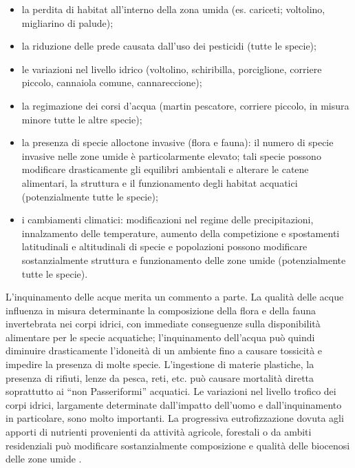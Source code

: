 \documentclass[10pt,twoside,openany,x11names,svgnames,italian,a5paper,dvipsnames,table]{memoir}
\begin{document}
\begin{itemize}
  \item la perdita di habitat all'interno della zona umida (es. cariceti; voltolino, migliarino di palude);
  \item la riduzione delle prede causata dall’uso dei pesticidi (tutte le specie);
  \item le variazioni nel livello idrico (voltolino, schiribilla, porciglione, corriere piccolo, cannaiola comune, cannareccione);
  \item la regimazione dei corsi d'acqua (martin pescatore, corriere piccolo, in misura minore tutte le altre specie);
  \item la presenza di specie alloctone invasive (flora e fauna): il numero di specie invasive nelle zone umide è particolarmente elevato; tali specie possono modificare drasticamente gli equilibri ambientali e alterare le catene alimentari, la struttura e il funzionamento degli habitat acquatici (potenzialmente tutte le specie);
  \item i cambiamenti climatici: modificazioni nel regime delle precipitazioni, innalzamento delle temperature, aumento della competizione e spostamenti latitudinali e altitudinali di specie e popolazioni possono modificare sostanzialmente struttura e funzionamento delle zone umide (potenzialmente tutte le specie).
\end{itemize}



L'inquinamento delle acque merita un commento a parte. La qualità delle acque influenza in misura determinante la composizione della flora e della fauna invertebrata nei corpi idrici, con immediate conseguenze sulla disponibilità alimentare per le specie acquatiche; l'inquinamento dell'acqua può quindi diminuire drasticamente l'idoneità di un ambiente fino a causare tossicità e impedire la presenza di molte specie. L'ingestione di materie plastiche, la presenza di rifiuti, lenze da pesca, reti, etc. può causare mortalità diretta soprattutto ai “non Passeriformi” acquatici. Le variazioni nel livello trofico dei corpi idrici, largamente determinate dall'impatto dell'uomo e dall'inquinamento in particolare, sono molto importanti. La progressiva eutrofizzazione dovuta agli apporti di nutrienti provenienti da attività agricole, forestali o da ambiti residenziali può modificare sostanzialmente composizione e qualità delle biocenosi delle zone umide \cite{Gustin09} \cite{Gustin10}. 
\end{document}
